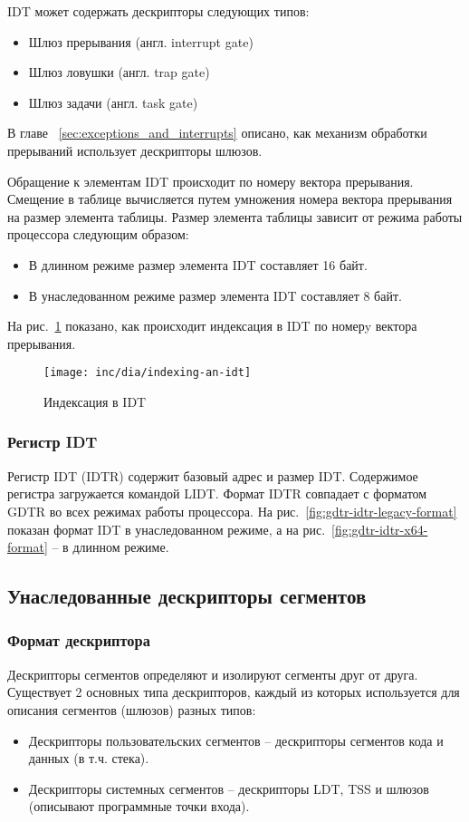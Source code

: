 IDT может содержать дескрипторы следующих типов:
\begin{itemize}
	\item Шлюз прерывания (англ. interrupt gate)
	\item Шлюз ловушки (англ. trap gate)
	\item Шлюз задачи (англ. task gate)
\end{itemize}

В главе ~\ref{sec:exceptions_and_interrupts} описано,
как механизм обработки прерываний использует дескрипторы шлюзов.

Обращение к элементам IDT происходит по номеру вектора прерывания. Смещение в таблице вычисляется путем
умножения номера вектора прерывания на размер элемента таблицы. Размер элемента таблицы зависит от
режима работы процессора следующим образом:
\begin{itemize}
\item В длинном режиме размер элемента IDT составляет 16 байт.
\item В унаследованном режиме размер элемента IDT составляет 8 байт.
\end{itemize}

На рис.~\ref{fig:indexing-an-idt} показано, как происходит индексация в IDT по номерy вектора прерывания.

\begin{figure}[ht!]
  \centering
  \texttt{[image: inc/dia/indexing-an-idt]}
  \caption{Индексация в IDT}
  \label{fig:indexing-an-idt}
\end{figure}


\subsubsection*{Регистр IDT}
Регистр IDT (IDTR) содержит базовый адрес и размер IDT.
Содержимое регистра загружается командой LIDT. Формат IDTR совпадает с форматом GDTR во
всех режимах работы процессора. На рис.~\ref{fig:gdtr-idtr-legacy-format} показан формат
IDT в унаследованном режиме, а на рис.~\ref{fig:gdtr-idtr-x64-format} -- в длинном режиме.

\subsection{Унаследованные дескрипторы сегментов}
\subsubsection*{Формат дескриптора}
Дескрипторы сегментов определяют и изолируют сегменты друг от друга. Существует 2 основных типа
дескрипторов, каждый из которых используется для описания сегментов (шлюзов) разных типов:
\begin{itemize}
	\item Дескрипторы пользовательских сегментов -- дескрипторы сегментов кода и данных (в т.ч. стека).
	\item Дескрипторы системных сегментов -- дескрипторы LDT, TSS и шлюзов (описывают программные точки входа).
\end{itemize}

